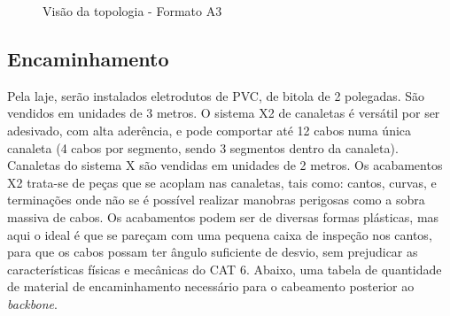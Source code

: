 \documentclass[	DIV=calc,%
							paper=a4,%
							fontsize=12pt,%
							onecolumn]{scrartcl}	 					%
\begin{document}
\begin{figure}
	\noindent{}
	\caption{Visão da topologia - Formato A3}
	\label{fig3}
\end{figure}

\clearpage
{}
\recalctypearea


\subsection{Encaminhamento}

Pela laje, serão instalados eletrodutos de PVC, de bitola de 2 polegadas. São vendidos em unidades de 3 metros. O sistema X2 de canaletas é versátil por ser adesivado, com alta aderência, e pode comportar até 12 cabos numa única canaleta (4 cabos por segmento, sendo 3 segmentos dentro da canaleta). Canaletas do sistema X são vendidas em unidades de 2 metros. Os acabamentos X2 trata-se de peças que se acoplam nas canaletas, tais como: cantos, curvas, e terminações onde não se é possível realizar manobras perigosas como a sobra massiva de cabos. Os acabamentos podem ser de diversas formas plásticas, mas aqui o ideal é que se pareçam com uma pequena caixa de inspeção nos cantos, para que os cabos possam ter ângulo suficiente de desvio, sem prejudicar as características físicas e mecânicas do CAT 6. Abaixo, uma tabela de quantidade de material de encaminhamento necessário para o cabeamento posterior ao \textit{backbone}.


\end{document}
